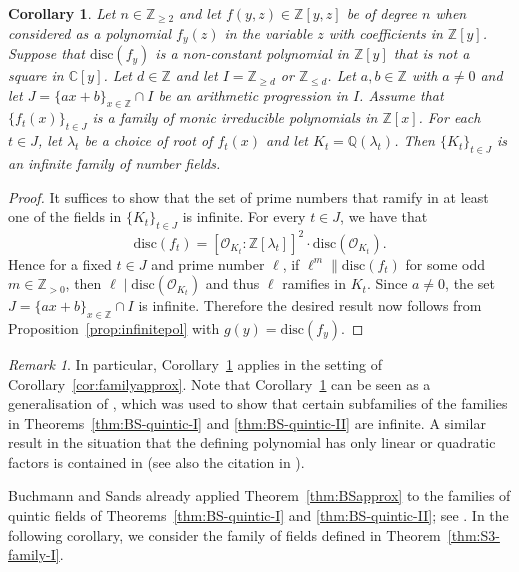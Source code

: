 \documentclass[12pt]{amsart}
\theoremstyle{plain}
\newtheorem{corollary}[theorem]{Corollary}
\theoremstyle{remark}
\newtheorem{remark}[theorem]{Remark}
\theoremstyle{definition}
\newcommand{\Z}{\mathbb{Z}}
\newcommand{\Q}{\mathbb{Q}}
\newcommand{\C}{\mathbb{C}}
\numberwithin{equation}{section}
\begin{document}
\begin{corollary}\label{cor:infinitepol}
Let $n \in \Z_{\geq 2}$ and let $f(y,z) \in \Z[y,z]$ be of degree $n$ when considered 
as a polynomial $f_{y}(z)$ in the variable $z$ with coefficients in $\Z[y]$.
Suppose that $\mathrm{disc}(f_{y})$ is a non-constant polynomial in $\Z[y]$ that is not a square in $\C[y]$.
Let $d \in \Z$ and let $I=\Z_{\geq d}$ or $\Z_{\leq d}$.
Let $a, b \in \Z$ with $a \neq 0$ and let $J=\{ax+b\}_{x\in\Z}\cap I$ be an arithmetic progression in $I$. 
Assume that $\{ f_{t}(x) \}_{t \in J}$ is a family of monic irreducible polynomials in $\Z[x]$. 
For each $t \in J$, let $\lambda_{t}$ be a choice of root of $f_{t}(x)$ and let $K_{t}=\Q(\lambda_{t})$.
Then $\{K_t\}_{t\in J}$ is an infinite family of number fields. 
\end{corollary}

\begin{proof}
It suffices to show that the set of prime numbers that ramify in at least one of the fields in $\{K_t\}_{t \in J}$ is infinite. 
For every $t \in J$, we have that
\[
\mathrm{disc}(f_{t})=[\mathcal{O}_{K_t}:\Z[\lambda_t]]^{2}\cdot \mathrm{disc}(\mathcal{O}_{K_t}).
\]
Hence for a fixed $t \in J$ and prime number $\ell$, if $\ell^{m} \parallel \mathrm{disc}(f_{t})$
for some odd $m \in \Z_{>0}$, then $\ell \mid \mathrm{disc}(\mathcal{O}_{K_{t}})$ and
thus $\ell$ ramifies in $K_{t}$. Since $a \neq 0$, the set $J=\{ax+b\}_{x\in\Z}\cap I$ is infinite.
Therefore the desired result now follows from Proposition~\ref{prop:infinitepol} with $g(y) = \mathrm{disc}(f_{y})$.
\end{proof}

\begin{remark}\label{rmk:finite}
In particular, Corollary~\ref{cor:infinitepol} applies in the setting of Corollary~\ref{cor:familyapprox}.
Note that Corollary~\ref{cor:infinitepol} can be seen as a generalisation of \cite[Proposition~5.1]{MR958040},
which was used to show that certain subfamilies of the families in Theorems~\ref{thm:BS-quintic-I} and
\ref{thm:BS-quintic-II} are infinite.
A similar result in the situation that the defining polynomial has only linear or quadratic factors is contained in \cite{MR3069398} (see also the citation in \cite[Proof of Lemma 3]{MR1378570}).
\end{remark}

Buchmann and Sands already applied Theorem~\ref{thm:BSapprox} to the families of quintic fields
of Theorems~\ref{thm:BS-quintic-I} and \ref{thm:BS-quintic-II}; 
see \cite[Corollaries 4.3 and 4.4, and Remark~4.5]{MR958040}. 
In the following corollary, we consider the family of fields defined in Theorem~\ref{thm:S3-family-I}.
\end{document}

